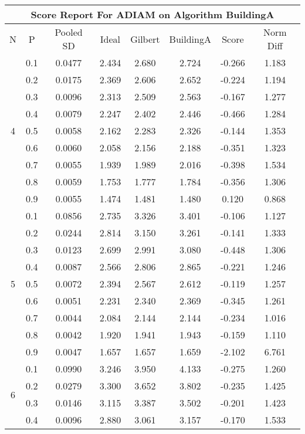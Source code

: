 \documentclass[11pt,a4paper]{report}
\begin{document}
\begin{longtable}{ | c | c || c | c | c | c | c | c | }
\hline
\multicolumn{8}{|c|}{ Score Report For ADIAM on Algorithm BuildingA} \\
\hline
N & P & Pooled SD &  Ideal &  Gilbert & BuildingA  & Score & Norm Diff \\
 \hline
 \hline
 \endhead
\multirow{9}{*}{4} & 0.1 & 0.0477 & 2.434 & 2.680 & 2.724 & -0.266 & 1.183 \\
 & 0.2 & 0.0175 & 2.369 & 2.606 & 2.652 & -0.224 & 1.194 \\
 & 0.3 & 0.0096 & 2.313 & 2.509 & 2.563 & -0.167 & 1.277 \\
 & 0.4 & 0.0079 & 2.247 & 2.402 & 2.446 & -0.466 & 1.284 \\
 & 0.5 & 0.0058 & 2.162 & 2.283 & 2.326 & -0.144 & 1.353 \\
 & 0.6 & 0.0060 & 2.058 & 2.156 & 2.188 & -0.351 & 1.323 \\
 & 0.7 & 0.0055 & 1.939 & 1.989 & 2.016 & -0.398 & 1.534 \\
 & 0.8 & 0.0059 & 1.753 & 1.777 & 1.784 & -0.356 & 1.306 \\
 & 0.9 & 0.0055 & 1.474 & 1.481 & 1.480 & 0.120 & 0.868 \\
 \hline
\multirow{9}{*}{5} & 0.1 & 0.0856 & 2.735 & 3.326 & 3.401 & -0.106 & 1.127 \\
 & 0.2 & 0.0244 & 2.814 & 3.150 & 3.261 & -0.141 & 1.333 \\
 & 0.3 & 0.0123 & 2.699 & 2.991 & 3.080 & -0.448 & 1.306 \\
 & 0.4 & 0.0087 & 2.566 & 2.806 & 2.865 & -0.221 & 1.246 \\
 & 0.5 & 0.0072 & 2.394 & 2.567 & 2.612 & -0.119 & 1.257 \\
 & 0.6 & 0.0051 & 2.231 & 2.340 & 2.369 & -0.345 & 1.261 \\
 & 0.7 & 0.0044 & 2.084 & 2.144 & 2.144 & -0.234 & 1.016 \\
 & 0.8 & 0.0042 & 1.920 & 1.941 & 1.943 & -0.159 & 1.110 \\
 & 0.9 & 0.0047 & 1.657 & 1.657 & 1.659 & -2.102 & 6.761 \\
 \hline
\multirow{9}{*}{6} & 0.1 & 0.0990 & 3.246 & 3.950 & 4.133 & -0.275 & 1.260 \\
 & 0.2 & 0.0279 & 3.300 & 3.652 & 3.802 & -0.235 & 1.425 \\
 & 0.3 & 0.0146 & 3.115 & 3.387 & 3.502 & -0.201 & 1.423 \\
 & 0.4 & 0.0096 & 2.880 & 3.061 & 3.157 & -0.170 & 1.533 \\

\end{longtable}
\end{document}
